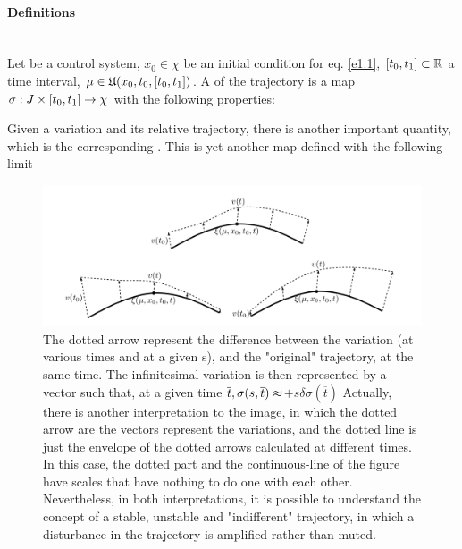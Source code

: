 \paragraph{Definitions}\mbox{}\\
Let \controlSystem\space be a control system, $x_0\in\chi$ be an initial condition for eq. \eqref{e1.1}, $[t_0,t_1]\subset\mathbb{R}$ a time interval, $\mu\in\mathfrak{U}(x_0,t_0,[t_0,t_1])$. A  of the trajectory \trajWinCond{\cdot} is a map $\sigma:J\times[t_0,t_1]\rightarrow\chi$ with the following properties: 

Given a variation and its relative trajectory, there is another important quantity, which is the corresponding . This is yet another map defined with the following limit
\begin{figure}[H]
	\includegraphics[width=\linewidth]{imgs/variations.png}
	\caption{The dotted arrow represent the difference between the variation (at various times and at a given s), and the "original" trajectory, at the same time. The infinitesimal variation is then represented by a vector such that, at a given time $\overline{t},\space\sigma(s,\overline{t})\approx$$+s\delta\sigma(\overline{t})$
		Actually, there is another interpretation to the image, in which the dotted arrow are the vectors represent the  variations, and the dotted line is just the envelope of the dotted arrows calculated at different times. In this case, the dotted part and the continuous-line of the figure have scales that have nothing to do one with each other. Nevertheless, in both interpretations, it is possible to understand the concept of a stable, unstable and "indifferent" trajectory, in which a disturbance in the trajectory is amplified rather than muted.}
	\label{fig-variations}
\end{figure}


